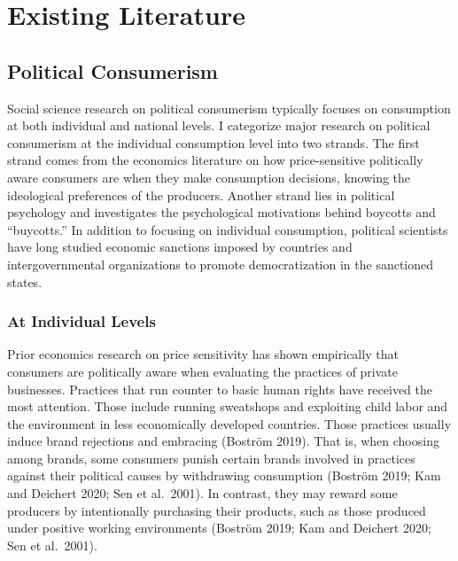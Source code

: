 \documentclass[letterpaper, 12pt]{article}
\begin{document}
\pagebreak
\section{Existing Literature}
 
\subsection{Political Consumerism}
Social science research on political consumerism typically focuses on consumption at both individual and national levels. I categorize major research on political consumerism at the individual consumption level into two strands. The first strand comes from the economics literature on how price-sensitive politically aware consumers are when they make consumption decisions, knowing the ideological preferences of the producers. Another strand lies in political psychology and investigates the psychological motivations behind boycotts and ``buycotts.'' In addition to focusing on individual consumption, political scientists have long studied economic sanctions imposed by countries and intergovernmental organizations to promote democratization in the sanctioned states.

\subsubsection{At Individual Levels}
Prior economics research on price sensitivity has shown empirically that consumers are politically aware when evaluating the practices of private businesses. Practices that run counter to basic human rights have received the most attention. Those include running sweatshops and exploiting child labor and the environment in less economically developed countries. Those practices usually induce brand rejections and embracing (Bostr{\"o}m 2019). That is, when choosing among brands, some consumers punish certain brands involved in practices against their political causes by withdrawing consumption (Bostr{\"o}m 2019; Kam and Deichert 2020; Sen et al.\ 2001). In contrast, they may reward some producers by intentionally purchasing their products, such as those produced under positive working environments (Bostr{\"o}m 2019; Kam and Deichert 2020; Sen et al.\ 2001).
\end{document}
